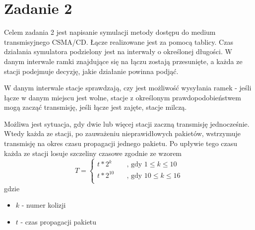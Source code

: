 \documentclass[titlepage]{article}
\begin{document}
\section{Zadanie 2}
Celem zadania 2 jest napisanie symulacji metody dostępu do medium transmisyjnego CSMA/CD. Łącze realizowane jest za pomocą tablicy. Czas działania symulatora podzielony jest na interwały o określonej długości. W danym interwale ramki znajdujące się na łączu zostają przesunięte, a każda ze stacji podejmuje decyzję, jakie działanie powinna podjąć. 

W danym interwale stacje sprawdzają, czy jest możliwość wysyłania ramek - jeśli łącze w danym miejscu jest wolne, stacje z określonym prawdopodobieństwem mogą zacząć transmisję, jeśli łącze jest zajęte, stacje milczą.

Możliwa jest sytuacja, gdy dwie lub więcej stacji zaczną transmisję jednocześnie. Wtedy każda ze stacji, po zauważeniu nieprawidłowych pakietów, wstrzymuje transmisję na okres czasu propagacji jednego pakietu. Po upływie tego czasu każda ze stacji losuje szczeliny czasowe zgodnie ze wzorem 
\newpage
\[   
T = 
     \begin{cases}
       t * 2^k &\quad\text{, gdy }1 \leq k \leq 10\\
       t * 2^{10} &\quad\text{, gdy }10 \leq k \leq 16\\
     \end{cases}
\]
gdzie
\begin{itemize}
\itemsep0em
\item $k$ - numer kolizji
\item $t$ - czas propagacji pakietu
\end{itemize}
\end{document}
